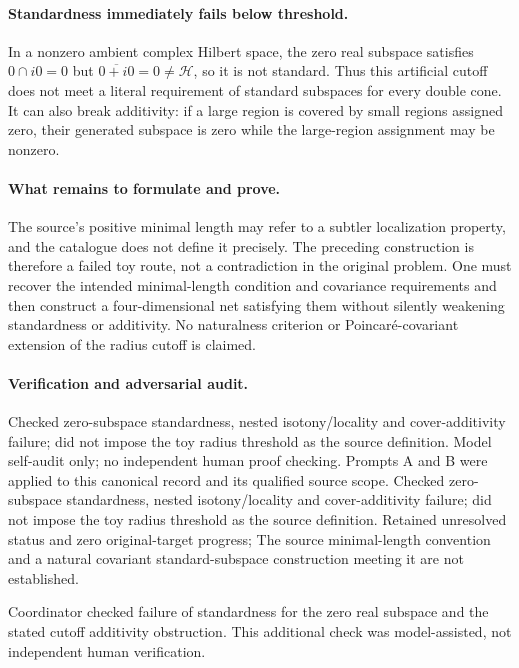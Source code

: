\documentclass[11pt]{article}
\begin{document}
\paragraph{Standardness immediately fails below threshold.} In a nonzero ambient complex Hilbert space, the zero real subspace satisfies $0\cap i0=0$ but $\overline{0+i0}=0\ne\mathcal H$, so it is not standard. Thus this artificial cutoff does not meet a literal requirement of standard subspaces for every double cone. It can also break additivity: if a large region is covered by small regions assigned zero, their generated subspace is zero while the large-region assignment may be nonzero.

\paragraph{What remains to formulate and prove.} The source's positive minimal length may refer to a subtler localization property, and the catalogue does not define it precisely. The preceding construction is therefore a failed toy route, not a contradiction in the original problem. One must recover the intended minimal-length condition and covariance requirements and then construct a four-dimensional net satisfying them without silently weakening standardness or additivity. No naturalness criterion or Poincaré-covariant extension of the radius cutoff is claimed.

\paragraph{Verification and adversarial audit.}
Checked zero-subspace standardness, nested isotony/locality and cover-additivity failure; did not impose the toy radius threshold as the source definition. Model self-audit only; no independent human proof checking. Prompts A and B were applied to this canonical record and its qualified source scope. Checked zero-subspace standardness, nested isotony/locality and cover-additivity failure; did not impose the toy radius threshold as the source definition. Retained unresolved status and zero original-target progress; The source minimal-length convention and a natural covariant standard-subspace construction meeting it are not established.

Coordinator checked failure of standardness for the zero real subspace and the stated cutoff additivity obstruction. This additional check was model-assisted, not independent human verification.
\end{document}
